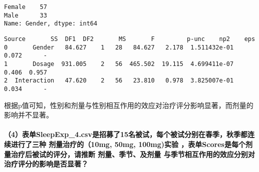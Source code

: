 \documentclass[11pt]{article}
\makeatletter
\newcommand{\boxspacing}{\kern\kvtcb@left@rule\kern\kvtcb@boxsep}
\newcommand{\prompt}[4]{
        \ttfamily\llap{{\color{#2}[#3]:\hspace{3pt}#4}}\vspace{-\baselineskip}
    }
\makeatother
\begin{document}
            \begin{tcolorbox}[breakable, size=fbox, boxrule=.5pt, pad at break*=1mm, opacityfill=0]
\prompt{Out}{outcolor}{11}{\boxspacing}
\begin{Verbatim}[commandchars=\\\{\}]
Female    57
Male      33
Name: Gender, dtype: int64
\end{Verbatim}
\end{tcolorbox}
        
            \begin{tcolorbox}[breakable, size=fbox, boxrule=.5pt, pad at break*=1mm, opacityfill=0]
\prompt{Out}{outcolor}{11}{\boxspacing}
\begin{Verbatim}[commandchars=\\\{\}]
        Source       SS  DF1  DF2       MS       F         p-unc    np2    eps
0       Gender   84.627    1   28   84.627   2.178  1.511432e-01  0.072      -
1       Dosage  931.005    2   56  465.502  19.115  4.699411e-07  0.406  0.957
2  Interaction   47.620    2   56   23.810   0.978  3.825007e-01  0.034      -
\end{Verbatim}
\end{tcolorbox}
        
    根据p值可知，性别和剂量与性别相互作用的效应对治疗评分影响显著，而剂量的影响并不显著。

    \hypertarget{ux8868ux5355sleepexp_4.csvux662fux62dbux52dfux4e8615ux540dux88abux8bd5ux6bcfux4e2aux88abux8bd5ux5206ux522bux5728ux6625ux5b63ux79cbux5b63ux90fdux8fdeux7eedux8fdbux884cux4e86ux4e09ux79cdux5242ux91cfux6cbbux7597ux768410mg-50mg-100mgux5b9eux9a8c-ux8868ux5355scoresux662fux6bcfux4e2aux5242ux91cfux6cbbux7597ux540eux88abux8bd5ux7684ux8bc4ux5206ux8bf7ux63a8ux65adux5242ux91cfux5b63ux8282ux53caux5242ux91cfux4e0eux5b63ux8282ux76f8ux4e92ux4f5cux7528ux7684ux6548ux5e94ux5206ux522bux5bf9ux6cbbux7597ux8bc4ux5206ux7684ux5f71ux54cdux662fux5426ux663eux8457}{%
\paragraph{（4）表单SleepExp\_4.csv是招募了15名被试，每个被试分别在春季，秋季都连续进行了三种
剂量治疗的（10mg,
50mg, 100mg)实验
，表单Scores是每个剂量治疗后被试的评分，请推断
剂量、季节、及剂量
与季节相互作用的效应分别对治疗评分的影响是否显著？}\label{ux8868ux5355sleepexp_4.csvux662fux62dbux52dfux4e8615ux540dux88abux8bd5ux6bcfux4e2aux88abux8bd5ux5206ux522bux5728ux6625ux5b63ux79cbux5b63ux90fdux8fdeux7eedux8fdbux884cux4e86ux4e09ux79cdux5242ux91cfux6cbbux7597ux768410mg-50mg-100mgux5b9eux9a8c-ux8868ux5355scoresux662fux6bcfux4e2aux5242ux91cfux6cbbux7597ux540eux88abux8bd5ux7684ux8bc4ux5206ux8bf7ux63a8ux65adux5242ux91cfux5b63ux8282ux53caux5242ux91cfux4e0eux5b63ux8282ux76f8ux4e92ux4f5cux7528ux7684ux6548ux5e94ux5206ux522bux5bf9ux6cbbux7597ux8bc4ux5206ux7684ux5f71ux54cdux662fux5426ux663eux8457}}
\end{document}

